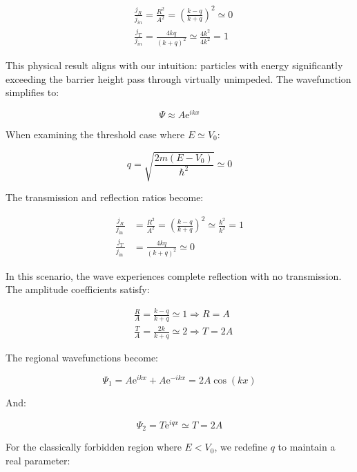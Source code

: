 \begin{align}
& \frac{j_{R}}{j_{i n}}=\frac{R^{2}}{A^{2}}=\left(\frac{k-q}{k+q}\right)^{2} \simeq 0  \\
& \frac{j_{T}}{j_{i n}}=\frac{4 k q}{(k+q)^{2}} \simeq \frac{4 k^{2}}{4 k^{2}}=1
\end{align}

This physical result aligns with our intuition: particles with energy significantly exceeding the barrier height pass through virtually unimpeded. The wavefunction simplifies to:

\begin{equation}
\Psi \approx A \mathrm{e}^{i k x}
\end{equation}

When examining the threshold case where $E \simeq V_{0}$:

\begin{equation}
q=\sqrt{\frac{2 m\left(E-V_{0}\right)}{\hbar^{2}}} \simeq 0
\end{equation}

The transmission and reflection ratios become:

\begin{align}
\frac{j_{R}}{j_{\text {in }}} & =\frac{R^{2}}{A^{2}}=\left(\frac{k-q}{k+q}\right)^{2} \simeq \frac{k^{2}}{k^{2}}=1  \\
\frac{j_{T}}{j_{\text {in }}} & =\frac{4 k q}{(k+q)^{2}} \simeq 0
\end{align}

In this scenario, the wave experiences complete reflection with no transmission. The amplitude coefficients satisfy:

\begin{align}
& \frac{R}{A}=\frac{k-q}{k+q} \simeq 1 \Longrightarrow R=A  \\
& \frac{T}{A}=\frac{2 k}{k+q} \simeq 2 \Longrightarrow T=2 A
\end{align}

The regional wavefunctions become:

\begin{equation}
\Psi_{1}=A \mathrm{e}^{i k x}+A \mathrm{e}^{-i k x}=2 A \cos (k x)
\end{equation}

And:

\begin{equation}
\Psi_{2}=T \mathrm{e}^{i q x} \simeq T=2 A
\end{equation}

For the classically forbidden region where $E<V_{0}$, we redefine $q$ to maintain a real parameter:

